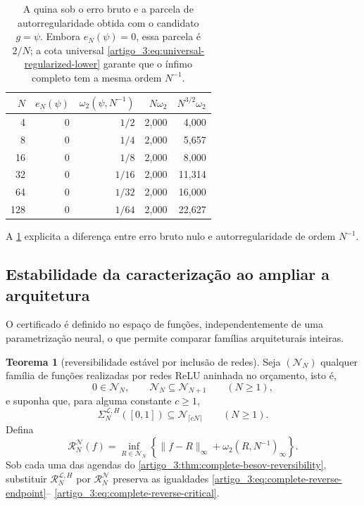 \documentclass[12pt,a4paper]{article}
\theoremstyle{preciso}
\theoremstyle{definition}
\newcommand{\Library}{\mathcal{L}}
\theoremstyle{preciso}
\newtheorem{theorem}[teorema]{Teorema}
\theoremstyle{preciso}
\theoremstyle{preciso}
\theoremstyle{preciso}
\theoremstyle{definition}
\theoremstyle{preciso}
\theoremstyle{definition}
\theoremstyle{preciso}
\theoremstyle{preciso}
\theoremstyle{definition}
\begin{document}
\begin{table}[t]
 \centering
\caption{A quina sob o erro bruto e a parcela de autorregularidade obtida
 com o candidato $g=\psi$. Embora $e_N(\psi)=0$, essa parcela é $2/N$; a
 cota universal \eqref{artigo_3:eq:universal-regularized-lower} garante que o ínfimo
 completo tem a mesma ordem $N^{-1}$.}\label{artigo_3:tab:kink-regularized-certificate}
\small
 \begin{tabular}{rrrrr}
\toprule
$N$ & $e_N(\psi)$ & $\omega_2(\psi,N^{-1})$ & $N\omega_2$ & $N^{3/2}\omega_2$\\
\midrule
4 & 0 & $1/2$ & 2{,}000 & 4{,}000\\
8 & 0 & $1/4$ & 2{,}000 & 5{,}657\\
16 & 0 & $1/8$ & 2{,}000 & 8{,}000\\
32 & 0 & $1/16$ & 2{,}000 & 11{,}314\\
64 & 0 & $1/32$ & 2{,}000 & 16{,}000\\
128 & 0 & $1/64$ & 2{,}000 & 22{,}627\\
\bottomrule
\end{tabular}
\end{table}

A \cref{artigo_3:tab:kink-regularized-certificate} explicita a diferença entre
erro bruto nulo e autorregularidade de ordem $N^{-1}$.

\subsection{Estabilidade da caracterização ao ampliar a arquitetura}

O certificado é definido no espaço de funções, independentemente de uma
parametrização neural, o que permite comparar famílias arquiteturais inteiras.

\begin{theorem}[reversibilidade estável por inclusão de redes]\label{map:artigo_3:5.14}
\label{artigo_3:thm:architecture-stable-reversibility}
Seja $(\mathcal N_N)$ qualquer família de funções realizadas por redes ReLU
aninhada no orçamento, isto é,
\begin{equation}
 0\in\mathcal N_N,
 \qquad \mathcal N_N\subseteq\mathcal N_{N+1}
 \qquad(N\ge1),
 \label{artigo_3:eq:network-family-nesting}
\end{equation}
e suponha que, para alguma constante $c\ge1$,
\begin{equation}
 \Sigma_N^{\Library,H}([0,1])\subseteq\mathcal N_{\lceil cN\rceil}
 \qquad(N\ge1).
 \label{artigo_3:eq:network-family-contains-library}
\end{equation}
Defina
\begin{equation}
 \mathcal R_N^{\mathcal N}(f)
 =\inf_{R\in\mathcal N_N}
 \left\{\|f-R\|_\infty+\omega_2(R,N^{-1})_\infty\right\}.
 \label{artigo_3:eq:network-regularized-certificate}
\end{equation}
Sob cada uma das agendas do
\cref{artigo_3:thm:complete-besov-reversibility}, substituir
$\mathcal R_N^{\Library,H}$ por $\mathcal R_N^{\mathcal N}$ preserva as
igualdades \eqref{artigo_3:eq:complete-reverse-endpoint}--
\eqref{artigo_3:eq:complete-reverse-critical}.
\end{theorem}
\end{document}

